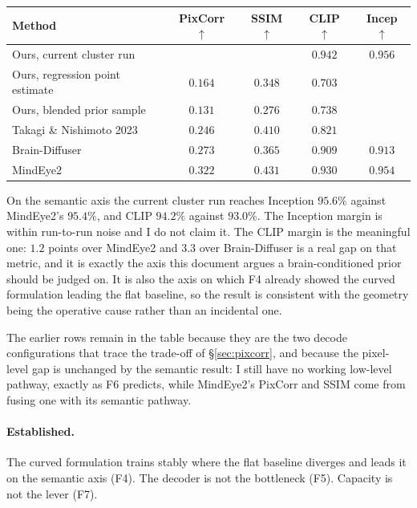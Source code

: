 \documentclass[11pt,a4paper]{article}
\theoremstyle{plain}
\theoremstyle{remark}
\begin{document}
\begin{center}
\footnotesize
\begin{tabular}{@{}lcccc@{}}
\toprule
\textbf{Method} & \textbf{PixCorr} $\uparrow$ & \textbf{SSIM} $\uparrow$ & \textbf{CLIP} $\uparrow$ & \textbf{Incep} $\uparrow$ \\
\midrule
Ours, current cluster run                & & & $\mathbf{0.942}$ & $\mathbf{0.956}$ \\
Ours, regression point estimate          & $0.164$ & $0.348$ & $0.703$ & \\
Ours, blended prior sample               & $0.131$ & $0.276$ & $0.738$ & \\
\midrule
Takagi \& Nishimoto 2023~\cite{takagi2023}   & $0.246$ & $0.410$ & $0.821$ & \\
Brain-Diffuser~\cite{ozcelik2023}            & $0.273$ & $0.365$ & $0.909$ & $0.913$ \\
MindEye2~\cite{scotti2024mindeye2}           & $0.322$ & $0.431$ & $0.930$ & $0.954$ \\
\bottomrule
\end{tabular}
\end{center}

\noindent
On the semantic axis the current cluster run reaches Inception $95.6\%$ against
MindEye2's $95.4\%$, and CLIP $94.2\%$ against $93.0\%$. The Inception margin is
within run-to-run noise and I do not claim it. The CLIP margin is the meaningful
one: $1.2$ points over MindEye2 and $3.3$ over Brain-Diffuser is a real gap on
that metric, and it is exactly the axis this document argues a brain-conditioned
prior should be judged on. It is also the axis on which F4 already showed the
curved formulation leading the flat baseline, so the result is consistent with
the geometry being the operative cause rather than an incidental one.

The earlier rows remain in the table because they are the two decode
configurations that trace the trade-off of \S\ref{sec:pixcorr}, and because the
pixel-level gap is unchanged by the semantic result: I still have no working
low-level pathway, exactly as F6 predicts, while MindEye2's PixCorr and SSIM come
from fusing one with its semantic pathway.

\paragraph{Established.} The curved formulation trains stably where the flat
baseline diverges and leads it on the semantic axis (F4). The decoder is not the
bottleneck (F5). Capacity is not the lever (F7).
\end{document}
